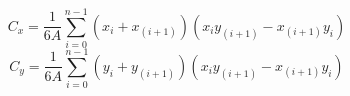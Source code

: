 \[C_x = \frac{1}{6A} \sum_{i=0}^{n-1} (x_i + x_(i+1)) (x_i y_(i+1) - x_(i+1) y_i)\]
\[C_y = \frac{1}{6A} \sum_{i=0}^{n-1} (y_i + y_(i+1)) (x_i y_(i+1) - x_(i+1) y_i)\]